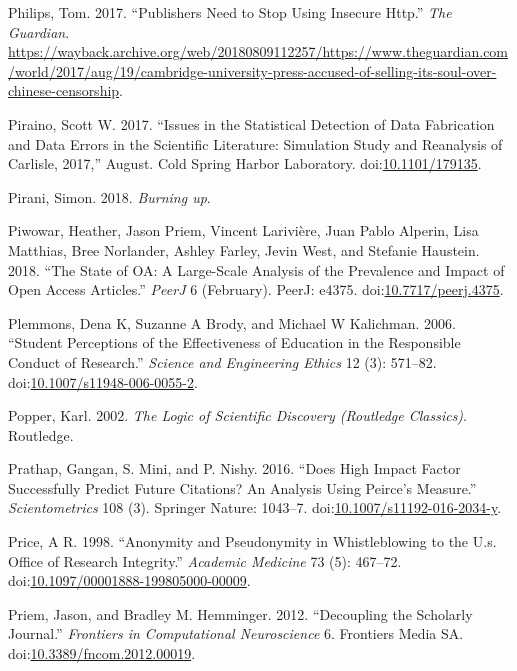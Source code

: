 \documentclass[a5paper]{book}
\begin{document}
\hypertarget{ref-guardian-cup}{}
Philips, Tom. 2017. ``Publishers Need to Stop Using Insecure Http.''
\emph{The Guardian}.
\url{https://wayback.archive.org/web/20180809112257/https://www.theguardian.com/world/2017/aug/19/cambridge-university-press-accused-of-selling-its-soul-over-chinese-censorship}.

\hypertarget{ref-doi:10.1101ux2f179135}{}
Piraino, Scott W. 2017. ``Issues in the Statistical Detection of Data
Fabrication and Data Errors in the Scientific Literature: Simulation
Study and Reanalysis of Carlisle, 2017,'' August. Cold Spring Harbor
Laboratory. doi:\href{https://doi.org/10.1101/179135}{10.1101/179135}.

\hypertarget{ref-isbn:9780745335612}{}
Pirani, Simon. 2018. \emph{Burning up}.

\hypertarget{ref-doi:10.7717ux2fpeerj.4375}{}
Piwowar, Heather, Jason Priem, Vincent Larivière, Juan Pablo Alperin,
Lisa Matthias, Bree Norlander, Ashley Farley, Jevin West, and Stefanie
Haustein. 2018. ``The State of OA: A Large-Scale Analysis of the
Prevalence and Impact of Open Access Articles.'' \emph{PeerJ} 6
(February). PeerJ: e4375.
doi:\href{https://doi.org/10.7717/peerj.4375}{10.7717/peerj.4375}.

\hypertarget{ref-doi:10.1007ux2fs11948-006-0055-2}{}
Plemmons, Dena K, Suzanne A Brody, and Michael W Kalichman. 2006.
``Student Perceptions of the Effectiveness of Education in the
Responsible Conduct of Research.'' \emph{Science and Engineering Ethics}
12 (3): 571--82.
doi:\href{https://doi.org/10.1007/s11948-006-0055-2}{10.1007/s11948-006-0055-2}.

\hypertarget{ref-isbn:9780415278430}{}
Popper, Karl. 2002. \emph{The Logic of Scientific Discovery (Routledge
Classics)}. Routledge.

\hypertarget{ref-doi:10.1007ux2fs11192-016-2034-y}{}
Prathap, Gangan, S. Mini, and P. Nishy. 2016. ``Does High Impact Factor
Successfully Predict Future Citations? An Analysis Using Peirce's
Measure.'' \emph{Scientometrics} 108 (3). Springer Nature: 1043--7.
doi:\href{https://doi.org/10.1007/s11192-016-2034-y}{10.1007/s11192-016-2034-y}.

\hypertarget{ref-doi:10.1097ux2f00001888-199805000-00009}{}
Price, A R. 1998. ``Anonymity and Pseudonymity in Whistleblowing to the
U.s. Office of Research Integrity.'' \emph{Academic Medicine} 73 (5):
467--72.
doi:\href{https://doi.org/10.1097/00001888-199805000-00009}{10.1097/00001888-199805000-00009}.

\hypertarget{ref-doi:10.3389ux2ffncom.2012.00019}{}
Priem, Jason, and Bradley M. Hemminger. 2012. ``Decoupling the Scholarly
Journal.'' \emph{Frontiers in Computational Neuroscience} 6. Frontiers
Media SA.
doi:\href{https://doi.org/10.3389/fncom.2012.00019}{10.3389/fncom.2012.00019}.
\end{document}
